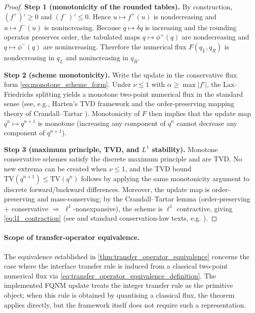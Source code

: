 \documentclass[sn-basic]{sn-jnl}
\theoremstyle{plain}
\theoremstyle{remark}
\begin{document}
\begin{proof}
\textbf{Step 1 (monotonicity of the rounded tables).}
By construction, \((f^+)'\ge 0\) and \((f^-)'\le 0\).
Hence \(u\mapsto f^+(u)\) is nondecreasing and \(u\mapsto f^-(u)\) is nonincreasing.
Because \(q\mapsto \delta q\) is increasing and the rounding operator preserves order, the tabulated maps
\(q\mapsto \phi^+(q)\) are nondecreasing and \(q\mapsto \phi^-(q)\) are nonincreasing.
Therefore the numerical flux \(F(q_L,q_R)\) is nondecreasing in \(q_L\) and nonincreasing in \(q_R\).

\textbf{Step 2 (scheme monotonicity).}
Write the update in the conservative flux form \cref{eq:monotone_scheme_form}.
Under $\nu\le 1$ with $\alpha\ge \max|f'|$, the Lax--Friedrichs splitting yields a monotone two-point numerical flux in the standard sense (see, e.g., Harten's TVD framework \cite{hartenHighResolutionSchemes1997} and the order-preserving mapping theory of Crandall--Tartar \cite{crandallRelationsNonexpansiveOrder1980}). Monotonicity of $F$ then implies that the update map $q^n\mapsto q^{n+1}$ is monotone (increasing any component of $q^n$ cannot decrease any component of $q^{n+1}$).

\textbf{Step 3 (maximum principle, TVD, and \(L^1\) stability).}
Monotone conservative schemes satisfy the discrete maximum principle and are TVD.
No new extrema can be created when \(\nu\le 1\), and the TVD bound \(\mathrm{TV}(q^{n+1})\le \mathrm{TV}(q^n)\) follows by applying the same monotonicity argument to discrete forward/backward differences.
Moreover, the update map is order-preserving and mass-conserving; by the Crandall--Tartar lemma (order-preserving \(+\) conservative \(\Rightarrow\) \(\ell^1\)-nonexpansive), the scheme is \(\ell^1\) contractive, giving \cref{eq:l1_contraction} (see \cite{crandallRelationsNonexpansiveOrder1980} and standard conservation-law texts, e.g. \cite{toroRiemannSolversNumerical2009}).

\end{proof}

\paragraph{Scope of transfer-operator equivalence.}
The equivalence established in \cref{thm:transfer_operator_equivalence} concerns the case where the interface transfer rule is induced from a classical two-point numerical flux via \cref{eq:transfer_operator_equivalence_definition}. The implemented FQNM update treats the integer transfer rule as the primitive object; when this rule is obtained by quantising a classical flux, the theorem applies directly, but the framework itself does not require such a representation.
\end{document}
